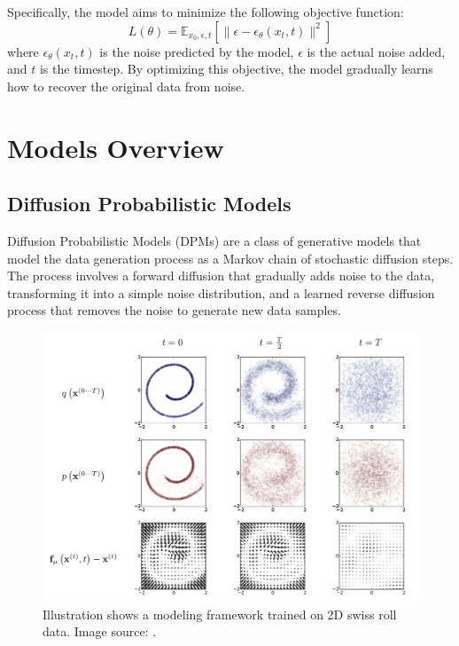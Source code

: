 \documentclass[sigconf,natbib=false]{acmart}
\begin{document}
Specifically, the model aims to minimize the following objective function:
\[
{L}(\theta) = \mathbb{E}_{x_0, \epsilon, t} \left[ \| \epsilon - \epsilon_\theta(x_t, t) \|^2 \right]
\]
where \( \epsilon_\theta(x_t, t) \) is the noise predicted by the model, \( \epsilon \) is the actual noise added, and \( t \) is the timestep. By optimizing this objective, the model gradually learns how to recover the original data from noise.

\section{Models Overview}

\subsection{Diffusion Probabilistic Models}
Diffusion Probabilistic Models (DPMs) are a class of generative models
that model the data generation process as a Markov chain of stochastic diffusion steps.
The process involves a forward diffusion that gradually adds noise to the data,
transforming it into a simple noise distribution,
and a learned reverse diffusion process that removes the noise to generate new data samples.

\begin{figure}[h]
  \centering
  \includegraphics[width=\linewidth]{imgs/150303585-F1.png}
  \caption{Illustration shows a modeling framework trained on 2D swiss roll data.
  Image source: \cite[Sohl-Dickstein et al. (2015)]{sohldickstein2015}.}
  \Description{}
\end{figure}
\end{document}
